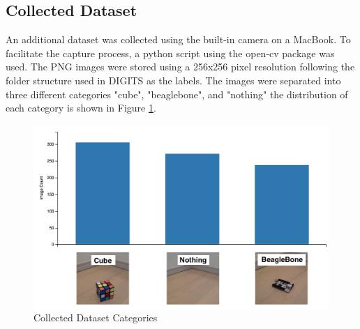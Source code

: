 \documentclass[10pt,journal,compsoc]{IEEEtran}
\begin{document}
\subsection{Collected Dataset}

An additional dataset was collected using the built-in camera on a MacBook. To facilitate the capture process, a python script using the open-cv package was used. The PNG images were stored using a 256x256 pixel resolution following the folder structure used in DIGITS as the labels. 
The images were separated into three different categories "cube", "beaglebone", and "nothing" the distribution of each category is shown in Figure \ref{fig:categories}.
\begin{figure}[thpb]
      \centering
      \includegraphics[width=\linewidth]{o_dataset_categories.png}
      \caption{Collected Dataset Categories}
      \label{fig:categories}
\end{figure}
\end{document}
